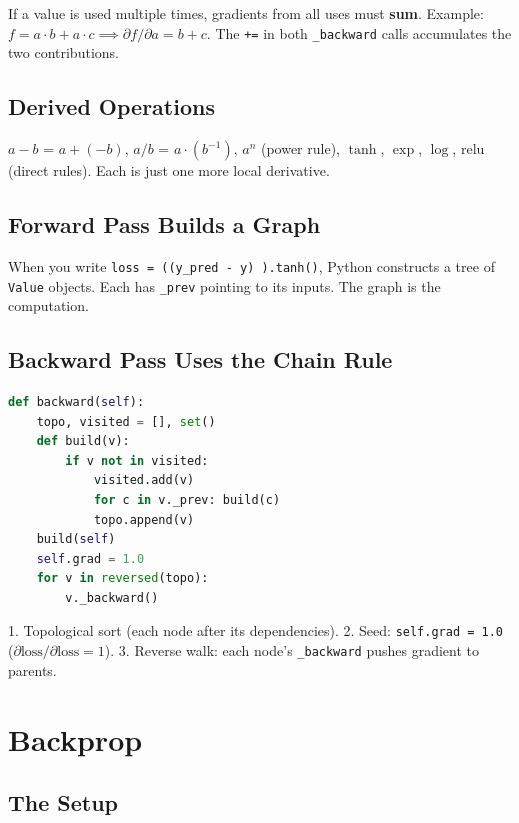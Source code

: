\documentclass[11pt,a4paper]{book}
\begin{document}
If a value is used multiple times, gradients from all uses must \textbf{sum}. Example:
$f = a \cdot b + a \cdot c \implies \partial f/\partial a = b + c$.
The \texttt{+=} in both \texttt{\_backward} calls accumulates the two contributions.

\section{Derived Operations}

$a - b$ = $a + (-b)$, $a / b$ = $a \cdot (b^{-1})$, $a^n$ (power rule), $\tanh$, $\exp$, $\log$, $\text{relu}$ (direct rules). Each is just one more local derivative.

\section{Forward Pass Builds a Graph}

When you write \texttt{loss = ((y\_pred - y) \*).tanh()}, Python constructs a tree of \texttt{Value} objects. Each has \texttt{\_prev} pointing to its inputs. The graph is the computation.

\section{Backward Pass Uses the Chain Rule}

\begin{lstlisting}[language=Python, frame=single, caption={The backward algorithm}]
def backward(self):
    topo, visited = [], set()
    def build(v):
        if v not in visited:
            visited.add(v)
            for c in v._prev: build(c)
            topo.append(v)
    build(self)
    self.grad = 1.0
    for v in reversed(topo):
        v._backward()
\end{lstlisting}
1. Topological sort (each node after its dependencies).
2. Seed: \texttt{self.grad = 1.0} ($\partial\text{loss}/\partial\text{loss} = 1$).
3. Reverse walk: each node's \texttt{\_backward} pushes gradient to parents.

\chapter{Backprop}\label{ch:backprop}

\section{The Setup}
\end{document}
